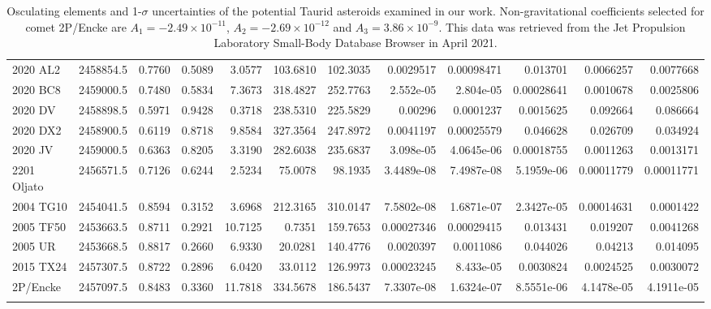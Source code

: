 \documentclass[letters,a4paper,fleqn,usenatbib]{mnras}
\begin{document}
\begin{table*}
{\begin{tabular}{lccrrrrrrrrr}
    2020 AL2   & 2458854.5 & 0.7760 & 0.5089 & 3.0577 & 103.6810 & 102.3035 & 0.0029517  & 0.00098471 & 0.013701   & 0.0066257  & 0.0077668  \\ 
    2020 BC8   & 2459000.5 & 0.7480 & 0.5834 & 7.3673 & 318.4827 & 252.7763 & 2.552e-05  & 2.804e-05  & 0.00028641 & 0.0010678  & 0.0025806  \\ 
    2020 DV    & 2458898.5 & 0.5971 & 0.9428 & 0.3718 & 238.5310 & 225.5829 & 0.00296    & 0.0001237  & 0.0015625  & 0.092664   & 0.086664   \\ 
    2020 DX2   & 2458900.5 & 0.6119 & 0.8718 & 9.8584 & 327.3564 & 247.8972 & 0.0041197  & 0.00025579 & 0.046628   & 0.026709   & 0.034924   \\ 
    2020 JV    & 2459000.5 & 0.6363 & 0.8205 & 3.3190 & 282.6038 & 235.6837 & 3.098e-05  & 4.0645e-06 & 0.00018755 & 0.0011263  & 0.0013171  \\ 
    2201 Oljato& 2456571.5 & 0.7126 & 0.6244 & 2.5234 & 75.0078 & 98.1935  & 3.4489e-08 & 7.4987e-08 & 5.1959e-06 & 0.00011779 & 0.00011771 \\ 
    2004 TG10  & 2454041.5 & 0.8594 & 0.3152 & 3.6968 & 212.3165 & 310.0147 & 7.5802e-08 & 1.6871e-07 & 2.3427e-05 & 0.00014631 & 0.0001422  \\ 
    2005 TF50  & 2453663.5 & 0.8711 & 0.2921 & 10.7125 & 0.7351 & 159.7653 & 0.00027346 & 0.00029415 & 0.013431   & 0.019207   & 0.0041268  \\ 
    2005 UR    & 2453668.5 & 0.8817 & 0.2660 & 6.9330 & 20.0281 & 140.4776 & 0.0020397  & 0.0011086  & 0.044026   & 0.04213    & 0.014095   \\ 
    2015 TX24  & 2457307.5 & 0.8722 & 0.2896 & 6.0420 & 33.0112 & 126.9973 & 0.00023245 & 8.433e-05  & 0.0030824  & 0.0024525  & 0.0030072  \\ 
    2P/Encke & 2457097.5 & 0.8483 & 0.3360 & 11.7818 & 334.5678 & 186.5437 & 7.3307e-08 & 1.6324e-07 & 8.5551e-06 & 4.1478e-05 & 4.1911e-05 \\ 
    & & & & & & & & & & & \\[-0.2cm]
    \hline  
    \hline
    \end{tabular}}
    \caption{Osculating elements and 1-$\sigma$ uncertainties of the potential Taurid asteroids examined in our work. Non-gravitational coefficients selected for comet 2P/Encke are $A_1=-2.49\times10^{-11}$, $A_2=-2.69\times10^{-12}$ and $A_3=3.86\times10^{-9}$. This data was retrieved from the Jet Propulsion Laboratory Small-Body Database Browser in April 2021. }
    \label{tab:IC}
\end{table*}
\end{document}
